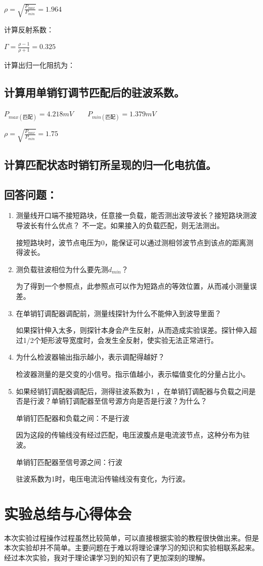 \documentclass{../source/Experiment}
\begin{document}
        $\rho = \sqrt{\displaystyle \frac{P_{max}}{P_{min}}} = 1.964$

        计算反射系数：

        $\Gamma = \displaystyle \frac{\rho-1}{\rho+1} = 0.325$

        计算出归一化阻抗为：


        \subsection{计算用单销钉调节匹配后的驻波系数。}
        $P_{max(\mbox{匹配})} = 4.218mV\qquad P_{min(\mbox{匹配})} = 1.379mV\qquad$

        $\rho = \sqrt{\displaystyle \frac{P_{max}}{P_{min}}} = 1.75$

        \subsection{计算匹配状态时销钉所呈现的归一化电抗值。}
        


        \subsection{回答问题：}
            \begin{enumerate}
                \item 测量线开口端不接短路块，任意接一负载，能否测出波导波长？接短路块测波导波长有什么优点？
                不一定。如果接入的负载匹配，则无法测出。\par 
            接短路块时，波节点电压为0，能保证可以通过测相邻波节点到该点的距离测得波长。
                \item 测负载驻波相位为什么要先测$d_{min}$？
                
                为了得到一个参照点，此参照点可以作为短路点的等效位置，从而减小测量误差。
                \item 在单销钉调配器调配前，测量线探针为什么不能伸入到波导里面？
                
                如果探针伸入太多，则探针本身会产生反射，从而造成实验误差。探针伸入超过1/2个矩形波导宽度时，会发生全反射，使实验无法正常进行。
                \item 为什么检波器输出指示越小，表示调配得越好？
                
                检波器测量的是交变的小信号。指示值越小，表示幅值变化的分量占比小。
                \item 如果经销钉调配器调配后，测得驻波系数为1 ，在单销钉调配器与负载之间是否是行波？单销钉调配器至信号源方向是否是行波？为什么？

                单销钉匹配器和负载之间：不是行波
                
                因为这段的传输线没有经过匹配，电压波腹点是电流波节点，这种分布为驻波。
    
                单销钉匹配器至信号源之间：行波
                
                驻波系数为1时，电压电流沿传输线没有变化，为行波。
                

            \end{enumerate}
    \section{实验总结与心得体会}
        本次实验过程操作过程虽然比较简单，可以直接根据实验的教程很快做出来。但是本次实验却并不简单。主要问题在于难以将理论课学习的知识和实验相联系起来。经过本次实验，我对于理论课学习到的知识有了更加深刻的理解。
\end{document}
